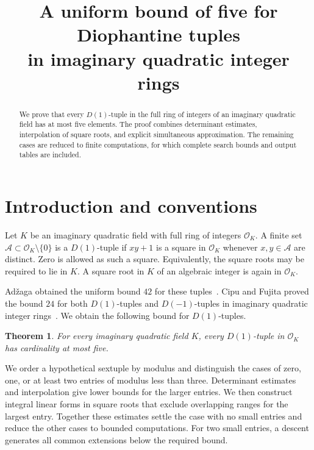 \documentclass[12pt]{article}
\title{A uniform bound of five for Diophantine tuples\\in imaginary quadratic integer rings}
\author{}
\date{}
\newtheorem{theorem}{Theorem}[section]
\numberwithin{equation}{section}
\begin{document}
\maketitle
\begin{abstract}
We prove that every $D(1)$-tuple in the full ring of integers of an
imaginary quadratic field has at most five elements. The proof combines
determinant estimates, interpolation of square roots, and explicit
simultaneous approximation. The remaining cases are reduced to finite
computations, for which complete search bounds and output tables are
included.
\end{abstract}

\section{Introduction and conventions}

Let $K$ be an imaginary quadratic field with full ring of integers
$\mathcal O_K$. A finite set $\mathcal A\subset\mathcal O_K\setminus\{0\}$
is a $D(1)$-tuple if $xy+1$ is a square in $\mathcal O_K$ whenever
$x,y\in\mathcal A$ are distinct. Zero is allowed as such a square.
Equivalently, the square roots may be required to lie in $K$. A square
root in $K$ of an algebraic integer is again in $\mathcal O_K$.

Ad\v zaga obtained the uniform bound $42$ for these tuples~\cite{A}.
Cipu and Fujita proved the bound $24$ for both $D(1)$-tuples and
$D(-1)$-tuples in imaginary quadratic integer rings~\cite{CF}.
We obtain the following bound for $D(1)$-tuples.

\begin{theorem}\label{thm:main}
For every imaginary quadratic field $K$, every $D(1)$-tuple in
$\mathcal O_K$ has cardinality at most five.
\end{theorem}

We order a hypothetical sextuple by modulus and distinguish the cases
of zero, one, or at least two entries of modulus less than three.
Determinant estimates and interpolation give lower bounds for the larger
entries. We then construct integral linear forms in square roots that
exclude overlapping ranges for the largest entry. Together these
estimates settle the case with no small entries and reduce the other
cases to bounded computations. For two small entries, a descent generates
all common extensions below the required bound.
\end{document}
